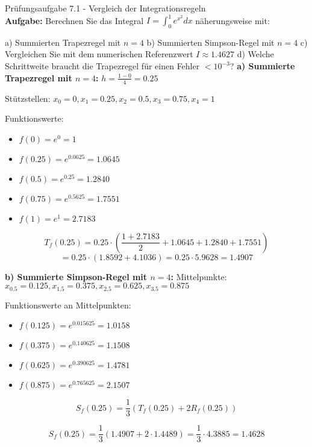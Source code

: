 \begin{example2}{Prüfungsaufgabe 7.1 - Vergleich der Integrationsregeln}\\
\textbf{Aufgabe:} Berechnen Sie das Integral $I = \int_0^1 e^{x^2} dx$ näherungsweise mit:

a) Summierten Trapezregel mit $n = 4$
b) Summierten Simpson-Regel mit $n = 4$ 
c) Vergleichen Sie mit dem numerischen Referenzwert $I \approx 1.4627$
d) Welche Schrittweite braucht die Trapezregel für einen Fehler $< 10^{-3}$?
\tcblower
\textbf{a) Summierte Trapezregel mit $n = 4$:}
$h = \frac{1-0}{4} = 0.25$

Stützstellen: $x_0 = 0, x_1 = 0.25, x_2 = 0.5, x_3 = 0.75, x_4 = 1$

Funktionswerte:
\begin{itemize}
    \item $f(0) = e^0 = 1$
    \item $f(0.25) = e^{0.0625} = 1.0645$
    \item $f(0.5) = e^{0.25} = 1.2840$
    \item $f(0.75) = e^{0.5625} = 1.7551$
    \item $f(1) = e^1 = 2.7183$
\end{itemize}

$$T_f(0.25) = 0.25 \cdot \left(\frac{1 + 2.7183}{2} + 1.0645 + 1.2840 + 1.7551\right)$$
$$= 0.25 \cdot (1.8592 + 4.1036) = 0.25 \cdot 5.9628 = 1.4907$$

\textbf{b) Summierte Simpson-Regel mit $n = 4$:}
Mittelpunkte: \\ $x_{0.5} = 0.125, x_{1.5} = 0.375, x_{2.5} = 0.625, x_{3.5} = 0.875$

Funktionswerte an Mittelpunkten:
\begin{itemize}
    \item $f(0.125) = e^{0.015625} = 1.0158$
    \item $f(0.375) = e^{0.140625} = 1.1508$
    \item $f(0.625) = e^{0.390625} = 1.4781$
    \item $f(0.875) = e^{0.765625} = 2.1507$
\end{itemize}

$$S_f(0.25) = \frac{1}{3}(T_f(0.25) + 2R_f(0.25))$$


$$S_f(0.25) = \frac{1}{3}(1.4907 + 2 \cdot 1.4489) = \frac{1}{3} \cdot 4.3885 = 1.4628$$


\end{example2}
